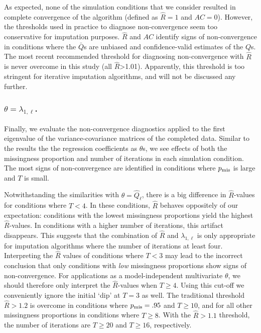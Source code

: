 \documentclass[Royal,times,sageh]{sagej}
\begin{document}
As expected, none of the simulation conditions that we consider resulted in complete convergence of the algorithm (defined as \(\widehat{R}=1\) and \(AC=0\)). However, the thresholds used in practice to diagnose non-convergence seem too conservative for imputation purposes. \(\widehat{R}\) and \(AC\) identify signs of non-convergence in conditions where the \(\bar{Q}\)s are unbiased and confidence-valid estimates of the \(Q\)s. The most recent recommended threshold for diagnosing non-convergence with \(\widehat{R}\) is never overcome in this study (all \(\widehat{R}\)\textgreater1.01). Apparently, this threshold is too stringent for iterative imputation algorithms, and will not be discussed any further.

\hypertarget{thetalambda_1-ell.}{%
\subsubsection{\texorpdfstring{\(\theta=\lambda_{1, \ell}\).}{\textbackslash theta=\textbackslash lambda\_\{1, \textbackslash ell\}.}}\label{thetalambda_1-ell.}}

Finally, we evaluate the non-convergence diagnostics applied to the first eigenvalue of the variance-covariance matrices of the completed data. Similar to the results the the regression coefficients as \(\theta\)s, we see effects of both the missingness proportion and number of iterations in each simulation condition. The most signs of non-convergence are identified in conditions where \(p_{\rm mis}\) is large and \(T\) is small.

Notwithstanding the similarities with \(\theta=\hat{Q}_\ell\), there is a big difference in \(\widehat{R}\)-values for conditions where \(T<4\). In these conditions, \(\widehat{R}\) behaves oppositely of our expectation: conditions with the lowest missingness proportions yield the highest \(\widehat{R}\)-values. In conditions with a higher number of iterations, this artifact disappears. This suggests that the combination of \(\widehat{R}\) and \(\lambda_{1, \ell}\) is only appropriate for imputation algorithms where the number of iterations at least four. Interpreting the \(\widehat{R}\) values of conditions where \(T<3\) may lead to the incorrect conclusion that only conditions with \emph{low} missingness proportions show signs of non-convergence. For applications as a model-independent multivariate \(\theta\), we should therefore only interpret the \(\widehat{R}\)-values when \(T\geq4\). Using this cut-off we conveniently ignore the initial `dip' at \(T=3\) as well. The traditional threshold \(\widehat{R} > 1.2\) is overcome in conditions where \(p_{\rm mis} = .95\) and \(T\geq10\), and for all other missingness proportions in conditions where \(T\geq8\). With the \(\widehat{R} > 1.1\) threshold, the number of iterations are \(T\geq20\) and \(T\geq16\), respectively.
\end{document}
